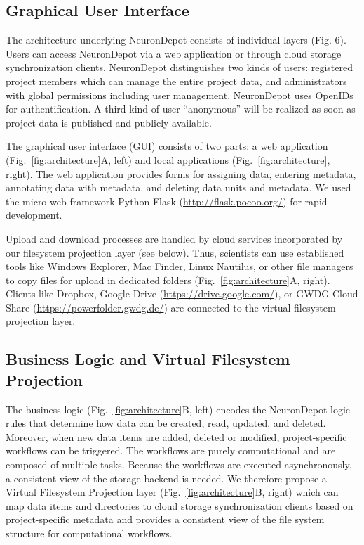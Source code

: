 \documentclass{frontiersSCNS} %
\begin{document}
\subsection{Graphical User Interface}
The architecture underlying NeuronDepot consists of individual layers (Fig. 6).
Users can access NeuronDepot via a web application or through cloud storage
synchronization clients. NeuronDepot distinguishes two kinds of users:
registered project members which can manage the entire project data, and
administrators with global permissions including user management. NeuronDepot
uses OpenIDs for authentification. A third kind of user “anonymous” will be
realized as soon as project data is published and publicly available.

The graphical user interface (GUI) consists of two parts: a web application
(Fig.~\ref{fig:architecture}A, left) and local applications
(Fig.~\ref{fig:architecture}, right). The web application provides forms for
assigning data, entering metadata, annotating data with metadata, and deleting
data units and metadata. We used the micro web framework Python-Flask
(\url{http://flask.pocoo.org/}) for rapid development.

Upload and download processes are handled by cloud services incorporated by
our filesystem projection layer (see below). Thus, scientists can use
established tools like Windows Explorer, Mac Finder, Linux Nautilus, or other
file managers to copy files for upload in dedicated folders
(Fig.~\ref{fig:architecture}A, right).  Clients like Dropbox, Google Drive
(\url{https://drive.google.com/}), or GWDG Cloud Share
(\url{https://powerfolder.gwdg.de/}) are connected to the virtual filesystem
projection layer. 


\subsection{Business Logic and Virtual Filesystem Projection}\label{sec:projection_layer}

The business logic (Fig.~\ref{fig:architecture}B, left) encodes the NeuronDepot
logic rules that determine how data can be created, read, updated, and deleted.
Moreover, when new data items are added, deleted or modified, project-specific
workflows can be triggered. The workflows are purely computational and are
composed of multiple tasks. Because the workflows are executed asynchronously,
a consistent view of the storage backend is needed. We therefore propose a
Virtual Filesystem Projection layer (Fig.~\ref{fig:architecture}B, right) which
can map data items and directories to cloud storage synchronization clients
based on project-specific metadata and provides a consistent view of the file
system structure for computational workflows.
\end{document}
